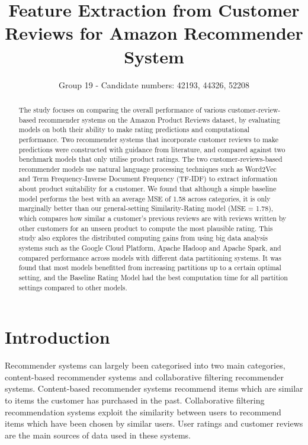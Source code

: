 \documentclass[sigconf,authorversion,nonacm]{acmart}
\begin{document}
\title{Feature Extraction from Customer Reviews for Amazon Recommender System}

\author{Group 19 - Candidate numbers: 42193, 44326, 52208}

\begin{abstract}
  The study focuses on comparing the overall performance of various customer-review-based recommender systems on the Amazon Product Reviews dataset, by evaluating models on both their ability to make rating predictions and computational performance. Two recommender systems that incorporate customer reviews to make predictions were constructed with guidance from literature, and compared against two benchmark models that only utilise product ratings. The two customer-reviews-based recommender models use natural language processing techniques such as Word2Vec and Term Frequency-Inverse Document Frequency (TF-IDF) to extract information about product suitability for a customer. We found that although a simple baseline model performs the best with an average MSE of 1.58 across categories, it is only marginally better than our general-setting Similarity-Rating model (MSE = 1.78), which compares how similar a customer's previous reviews are with reviews written by other customers for an unseen product to compute the most plausible rating. This study also explores the distributed computing gains from using big data analysis systems such as the Google Cloud Platform, Apache Hadoop and Apache Spark, and compared performance across models with different data partitioning systems. It was found that most models benefitted from increasing partitions up to a certain optimal setting, and the Baseline Rating Model had the best computation time for all partition settings compared to other models.

\end{abstract}


\maketitle

\section{Introduction}
    Recommender systems can largely been categorised into two main categories, content-based recommender systems and collaborative filtering recommender systems. Content-based recommender systems recommend items which are similar to items the customer has purchased in the past\cite{Pazzani2007}. Collaborative filtering recommendation systems exploit the similarity between users to recommend items which have been chosen by similar users\cite{Factor10}. User ratings and customer reviews are the main sources of data used in these systems. 
    
\end{document}
